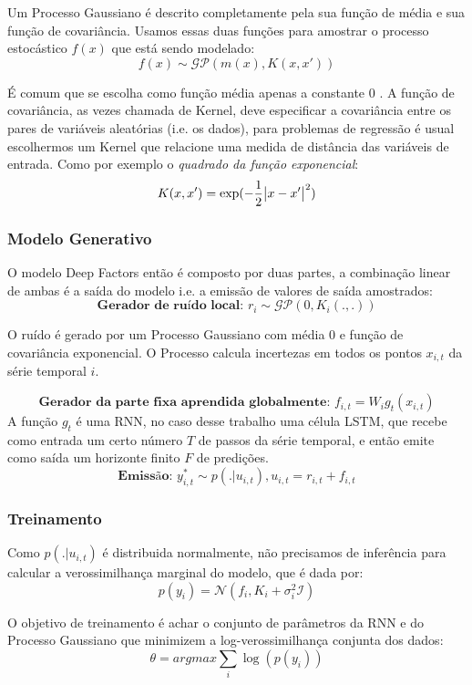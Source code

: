 Um Processo Gaussiano é descrito completamente pela sua função de média e sua função de covariância. Usamos essas duas funções para amostrar o processo estocástico $f(x)$ que está sendo modelado: \\

\[
f(x) \sim \mathcal{GP}( m(x), K(x,x'))
\]

É comum que se escolha como função média apenas a constante 0 \cite{gpml}.  A função de covariância, as vezes chamada de Kernel, deve especificar a covariância entre os pares de variáveis aleatórias (i.e. os dados), para problemas de regressão é usual escolhermos um Kernel que relacione uma medida de distância das variáveis de entrada. Como por exemplo o \textit{quadrado da função exponencial}: \\

\[
  K(x,x') = \exp(-\frac{1}{2}\abs{x - x'}^2)
\]


\subsubsection{Modelo Generativo}

O modelo Deep Factors então é composto por duas partes, a combinação linear de ambas é a saída do modelo i.e. a emissão de valores de saída amostrados: \\


\[
    \textbf{Gerador de ruído local: }  r_i \sim \mathcal{GP} (0, K_i(.,.))
\]

O ruído é gerado por um Processo Gaussiano com média 0 e função de covariância exponencial. O Processo calcula incertezas em todos os pontos $x_{i,t}$ da série temporal $i$.
  
\[
  \textbf{Gerador da parte fixa aprendida globalmente: }  f_{i,t} = W_ig_t(x_{i,t})
\]
A função $g_t$ é uma RNN, no caso desse trabalho uma célula LSTM, que recebe como entrada um certo número $T$ de passos da série temporal, e então emite como saída um horizonte finito $F$ de predições.
\[
  \textbf{Emissão: }  y^*_{i,t} \sim p(. | u_{i,t}) , u_{i,t} = r_{i,t} + f_{i,t}  
\]

\subsubsection{Treinamento}

Como $p(. | u_{i,t})$ é distribuida normalmente, não precisamos de inferência para calcular a verossimilhança marginal do modelo, que é dada por: \\

\[
p(y_{i}) = \mathcal{N}(f_i,K_i + \sigma_i^2\mathcal{I})
\]

O objetivo de treinamento é achar o conjunto de parâmetros da RNN e do Processo Gaussiano que minimizem a log-verossimilhança conjunta dos dados: \\
\[
\theta = argmax \sum_i{\log(p(y_i))}
\]


